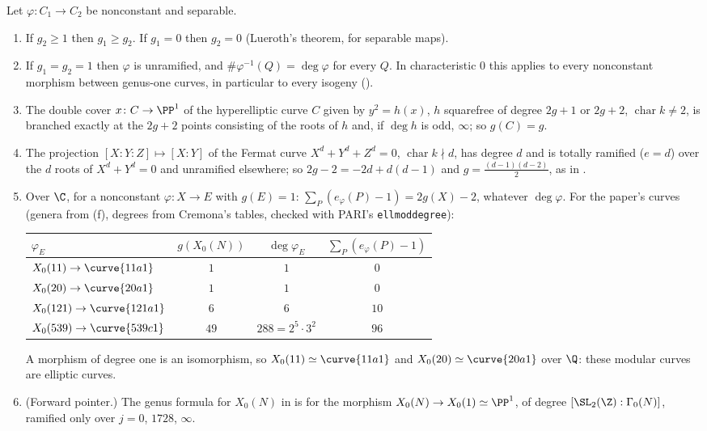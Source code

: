\begin{corollary}\label{cor:curves:rh-consequences}
Let $\varphi\colon C_1\to C_2$ be nonconstant and separable.
\begin{enumerate}[label=(\alph*)]
\item If $g_2\ge1$ then $g_1\ge g_2$. If $g_1=0$ then $g_2=0$ (Lueroth's theorem, for separable maps).
\item If $g_1=g_2=1$ then $\varphi$ is unramified, and $\#\varphi^{-1}(Q)=\deg\varphi$ for every $Q$. In characteristic $0$ this applies to every nonconstant morphism
between genus-one curves, in particular to every isogeny ().
\item The double cover $x\colon C\to\PP^1$ of the hyperelliptic curve $C$ given by $y^2=h(x)$, $h$ squarefree of degree $2g+1$ or $2g+2$,
$\operatorname{char}k\ne2$, is branched exactly at the $2g+2$ points consisting of the roots of $h$ and, if $\deg h$ is odd, $\infty$; so $g(C)=g$.
\item The projection $[X:Y:Z]\mapsto[X:Y]$ of the Fermat curve $X^d+Y^d+Z^d=0$, $\operatorname{char}k\nmid d$, has degree $d$ and is totally ramified ($e=d$) over the $d$
roots of $X^d+Y^d=0$ and unramified elsewhere; so $2g-2=-2d+d(d-1)$ and $g=\frac{(d-1)(d-2)}2$, as in .
\item Over $\C$, for a nonconstant $\varphi\colon X\to E$ with $g(E)=1$: $\sum_P(e_\varphi(P)-1)=2g(X)-2$, whatever $\deg\varphi$. For the paper's curves (genera from
(f), degrees from Cremona's tables, checked with PARI's \texttt{ellmoddegree}):
\begin{center}
\small
\begin{tabular}{@{}lccc@{}}
\toprule
$\varphi_E$ & $g(X_0(N))$ & $\deg\varphi_E$ & $\sum_P(e_\varphi(P)-1)$ \\
\midrule
$X_0(11)\to\curve{11a1}$ & $1$ & $1$ & $0$ \\
$X_0(20)\to\curve{20a1}$ & $1$ & $1$ & $0$ \\
$X_0(121)\to\curve{121a1}$ & $6$ & $6$ & $10$ \\
$X_0(539)\to\curve{539c1}$ & $49$ & $288=2^5\cdot3^2$ & $96$ \\
\bottomrule
\end{tabular}
\end{center}
A morphism of degree one is an isomorphism, so $X_0(11)\simeq\curve{11a1}$ and $X_0(20)\simeq\curve{20a1}$ over $\Q$: these modular curves are elliptic curves.
\item (Forward pointer.) The genus formula for $X_0(N)$ in  is  for the morphism $X_0(N)\to X_0(1)\simeq\PP^1$, of degree
$[\SL_2(\Z):\Gamma_0(N)]$, ramified only over $j=0$, $1728$, $\infty$.
\end{enumerate}
\end{corollary}


